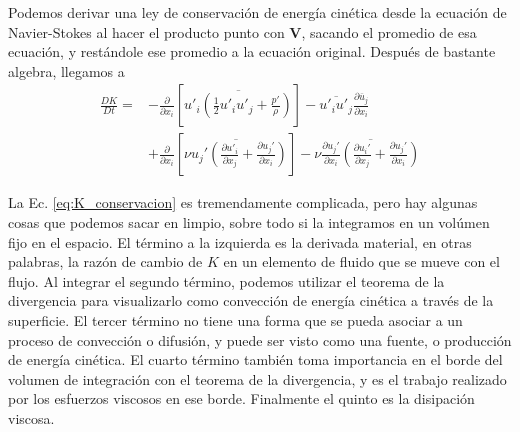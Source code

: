 Podemos derivar una ley de conservación de energía cinética desde la ecuación de Navier-Stokes al hacer el producto punto con $\mathbf{V}$, sacando el promedio de esa ecuación, y restándole ese promedio a la ecuación original. 
Después de bastante algebra, llegamos a
%
\begin{align}\label{eq:K_conservacion}
\frac{DK}{Dt} =& -\frac{\partial}{\partial x_i} \left[ \overline{u'_i\left(\frac{1}{2}u'_iu'_j+\frac{p'}{\rho}\right)}\right] - \overline{u'_iu'_j}\frac{\partial\overline{u}_j}{\partial x_i} \nonumber\\
               & + \frac{\partial}{\partial x_i}\left[\overline{\nu u_j'\left(\frac{\partial u'_i}{\partial x_j} + \frac{\partial u_j'}{\partial x_i}\right)}\right] -\nu\overline{\frac{\partial u_j'}{\partial x_i}\left(\frac{\partial u_i'}{\partial x_j}+\frac{\partial u_j'}{\partial x_i}\right)}
\end{align}

La Ec. \eqref{eq:K_conservacion} es tremendamente complicada, pero hay algunas cosas que podemos sacar en limpio, sobre todo si la integramos en un volúmen fijo en el espacio.
El término a la izquierda es la derivada material, en otras palabras, la razón de cambio de $K$ en un elemento de fluido que se mueve con el flujo.
Al integrar el segundo término, podemos utilizar el teorema de la divergencia para visualizarlo como convección de energía cinética a través de la superficie.
El tercer término no tiene una forma que se pueda asociar a un proceso de convección o difusión, y puede ser visto como una fuente, o producción de energía cinética.
El cuarto término también toma importancia en el borde del volumen de integración con el teorema de la divergencia, y es el trabajo realizado por los esfuerzos viscosos en ese borde.
Finalmente el quinto es la disipación viscosa.



